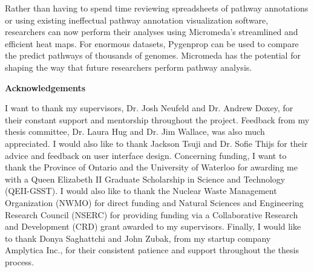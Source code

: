 Rather than having to spend time reviewing spreadsheets of pathway annotations 
or using existing ineffectual pathway annotation visualization software, 
researchers can now perform their analyses using Micromeda's streamlined and 
efficient heat maps. For enormous datasets, Pygenprop can be used to compare the 
predict pathways of thousands of genomes. Micromeda has the potential for 
shaping the way that future researchers perform pathway analysis.


\cleardoublepage


\begin{center}\textbf{Acknowledgements}\end{center}

I want to thank my supervisors, Dr. Josh Neufeld and Dr. Andrew Doxey, for their 
constant support and mentorship throughout the project. Feedback from my thesis 
committee, Dr. Laura Hug and Dr. Jim Wallace, was also much appreciated. I would 
also like to thank Jackson Tsuji and Dr. Sofie Thijs for their advice and 
feedback on user interface design. Concerning funding, I want to thank the 
Province of Ontario and the University of Waterloo for awarding me with a Queen 
Elizabeth II Graduate Scholarship in Science and Technology (QEII-GSST). I would 
also like to thank the Nuclear Waste Management Organization (NWMO) for direct 
funding and Natural Sciences and Engineering Research Council (NSERC) for 
providing funding via a Collaborative Research and Development (CRD) grant 
awarded to my supervisors. Finally, I would like to thank Donya Saghattchi and 
John Zubak, from my startup company Amplytica Inc., for their consistent 
patience and support throughout the thesis process.


\cleardoublepage

\renewcommand\contentsname{Table of Contents}
\tableofcontents
\cleardoublepage
{}    %

\listoffigures
\cleardoublepage
{}		%

\listoftables
\cleardoublepage
{}		%

\printglossaries
\cleardoublepage
{}		%


